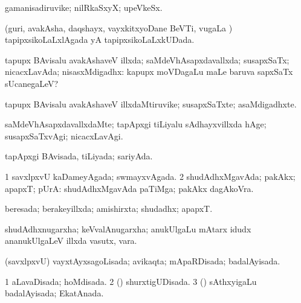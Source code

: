 {{\bentry
{} 
\gl{\nA}
\expl{}
\bmng
gamanisadiruvike; nilRkaSxyX; upeVkeSx. 
\emng
\eentry

\bentry
{} 
\gl{\gu}
\expl{}
\bmng
(guri, avakAsha, daqshayx, vayxkitxyoDane BeVTi, \mo vugaLa \vi) tapipxsikoLaLxlAgada yA tapipxsikoLaLxkUDada. 
\emng
\eentry

\bentry
{} 
\gl{\nA}
\expl{}
\bmng
{} 
\emng
\eentry

\bentry
{} 
\gl{\gu}
\expl{}
\bmng
tapupx BAvisalu avakAshaveV illxda; saMdeVhAsapxdavallxda; susapxSaTx; nicacxLavAda; nisasxMdigadhx:  kapupx moVDagaLu maLe baruva sapxSaTx sUcanegaLeV? 
\emng
\eentry

\bentry
{} 
\gl{\nA}
\expl{}
\bmng
tapupx BAvisalu avakAshaveV illxdaMtiruvike; susapxSaTxte; asaMdigadhxte. 
\emng
\eentry

\bentry
{} 
\gl{\kirxvi}
\expl{}
\bmng
saMdeVhAsapxdavallxdaMte; tapApxgi tiLiyalu sAdhayxvillxda hAge; susapxSaTxvAgi; nicacxLavAgi. 
\emng
\eentry

\bentry
{} 
\gl{\gu}
\expl{}
\bmng
tapApxgi BAvisada, tiLiyada; sariyAda. 
\emng
\eentry

\bentry
{} 
\gl{\gu}
\expl{}
\bmng
\bnum
\num{1} savxlpxvU kaDameyAgada; swmayxvAgada. 
\num{2} shudAdhxMgavAda; pakAkx; apapxT; pUrA:  shudAdhxMgavAda paTiMga; pakAkx dagAkoVra. 
\enum
\emng
\eentry

\bentry
{} 
\gl{\gu}
\expl{}
\bmng
beresada; berakeyillxda; amishirxta; shudadhx; apapxT. 
\emng

\noindent
\gl{\pagu}
\expl{}
\bmng
{} shudAdhxnugarxha; keVvalAnugarxha; anukUlgaLu mAtarx idudx ananukUlgaLeV illxda vasutx, vara. 
\emng
\eentry

\bentry
{} 
\gl{\gu}
\expl{}
\bmng
(savxlpxvU) vayxtAyxsagoLisada; avikaqta; mApaRDisada; badalAyisada. 
\emng
\eentry

\bentry
{} 
\gl{\gu}
\expl{}
\bmng
\bnum
\num{1} aLavaDisada; hoMdisada. 
\num{2} (\dhavxni) shurxtigUDisada. 
\num{3} (\saM) sAthxyigaLu badalAyisada; EkatAnada. 
\enum
\emng
\eentry

}}
